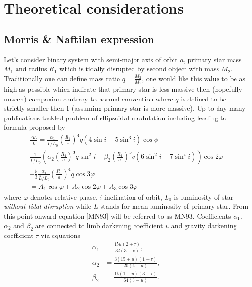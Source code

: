 \documentclass{pracalicmgr}
\begin{document}
\chapter{Theoretical considerations}\label{theo}
\section{Morris \& Naftilan expression}
\hspace{1cm} Let's consider binary system with semi-major axis of orbit $a$, primary star mass $M_1$ and radius $R_1$ which is tidally disrupted by second object with mass $M_2$.
Traditionally one can define mass ratio $q=\frac{M_2}{M_1}$, one would like this value to be as high as possible which indicate that primary star
is less massive then (hopefully unseen) companion contrary to normal convention where $q$ is defined to be strictly smaller then $1$ (assuming primary star is more massive).
Up to day many publications tackled problem of ellipsoidal modulation including \citet{kopal_close_1959} leading to formula proposed by \citet{morris_equations_1993}  
\begin{equation}\label{MN93}
    \begin{split}
    \frac{\Delta{L}}{\overline{L}}  =\frac{\alpha_1}{\overline{L}/L_0}\left(\frac{R_1}{a}\right)^4q\left(4\sin{i}-5\sin^3{i}\right)\cos{\phi}- \\
    \frac{1}{\overline{L}/L_0}\left(\alpha_2\left(\frac{R_1}{a}\right)^3q\sin^2{i}+\beta_2
    \left(\frac{R_1}{a}\right)^5q\left(6\sin^2{i}-7\sin^4{i}\right)\right)\cos{2\varphi} \\
    -\frac{5}{3}\frac{\alpha_1}{\overline{L}/L_0}\left(\frac{R_1}{a}\right)^4q\cos{3\varphi}=\\
     = A_1\cos{\varphi}+A_2\cos{2\varphi}+A_3\cos{3\varphi}
    \end{split}
\end{equation}
where $\varphi$ denotes relative phase, $i$ inclination of orbit, $L_0$ is luminosity of star {\it without tidal disruption} while $\overline{L}$ stands for mean luminosity of primary star. From this point
onward equation \ref{MN93} will be referred to as MN93.
Coefficients $\alpha_1$, $\alpha_2$ and
$\beta_2$ are connected to limb darkening coefficient $u$ and gravity darkening coefficient $\tau$ via equations
\begin{align}
    \alpha_1 &=\frac{15u(2+\tau)}{32(3-u)},\\
    \alpha_2 &=\frac{3(15+u)(1+\tau)}{20(3-u)},\\
    \beta_2 &=\frac{15(1-u)(3+\tau)}{64(3-u)}.
\end{align}
\end{document}
